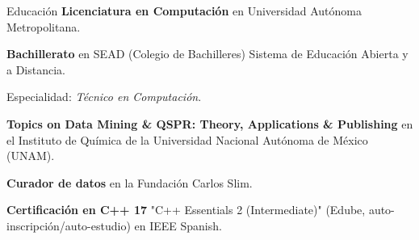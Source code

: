 
\begin{rubric}{Educación}
	\textbf{Licenciatura en Computación} en Universidad Autónoma Metropolitana.

	\entry*[2016 -- 2017]%
	\textbf{Bachillerato} en SEAD (Colegio de Bachilleres) Sistema de Educación Abierta y a Distancia.
	\par Especialidad: \emph{Técnico en Computación}.

	\entry*[] \textbf{Topics on Data Mining \& QSPR: Theory, Applications \& Publishing} en el Instituto de Química de la Universidad Nacional Autónoma de México (UNAM).

	\entry*[] \textbf{Curador de datos} en la Fundación Carlos Slim.

	\entry*[] \textbf{Certificación en C++ 17} "C++ Essentials 2 (Intermediate)" (Edube, auto-inscripción/auto-estudio) en IEEE Spanish.
\end{rubric}

